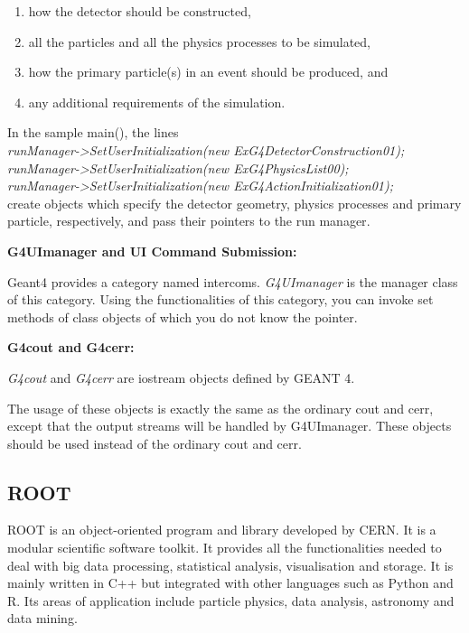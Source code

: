 \begin{enumerate}
	\item how the detector should be constructed,
	\item all the particles and all the physics processes to be simulated,
	\item  how the primary particle(s) in an event should be produced, and
	\item any additional requirements of the simulation.
\end{enumerate}

In the sample main(), the lines\\
\textit{runManager->SetUserInitialization(new ExG4DetectorConstruction01);\\
runManager->SetUserInitialization(new ExG4PhysicsList00);\\
runManager->SetUserInitialization(new ExG4ActionInitialization01);\\} 
create objects which specify the detector geometry, physics processes and primary particle, respectively, and pass their pointers to the run manager\cite{geant4}.


\textbf{G4UImanager and UI Command Submission:}

Geant4 provides a category named intercoms. \textit{G4UImanager} is the manager class of this category. 
Using the functionalities of this category, you can invoke set methods of class objects of which you do not know the pointer\cite{geant4}.


\textbf{G4cout and G4cerr:}

\textit{G4cout} and \textit{G4cerr} are iostream objects defined by GEANT 4.

The usage of these objects is exactly the same as the ordinary cout and cerr, except that the output streams will be handled by G4UImanager.
These objects should be used instead of the ordinary cout and cerr\cite{geant4}.







\subsection{ROOT}
ROOT is an object-oriented program and library developed by CERN. It is a modular scientific software toolkit. It provides all the functionalities needed to deal with big data processing, statistical analysis, visualisation and storage. It is mainly written in C++ but integrated with other languages such as Python and R. Its areas of application include particle physics, data analysis, astronomy and data mining\cite{wiki:1}.

